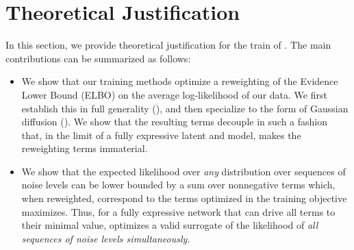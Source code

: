 
\section{Theoretical Justification}
\label{appendix:theory}
\newcommand\numberthis{\addtocounter{equation}{1}\tag{\theequation}}
\newcommand{\cD}{\mathcal{D}}
\newcommand{\unifsim}{\overset{\mathrm{unif}}{\sim}}
\newcommand{\Eforward}{\Exp_{\mathrm{forward}}}
\newcommand{\EforwardD}{\Exp_{\mathrm{forward},\cD}}

\newcommand{\Epz}{\Exp_{p,\mathbf{z}_{1:T}}}
\newcommand{\I}{\mathbf{1}}
\newcommand{\rmd}{\mathrm{d}}
\newcommand{\Dkl}{\mathrm{D}_{\mathbb{KL}}}

\newcommand{\veck}{\mathbf{k}}
\newcommand{\bbK}{\mathbb{K}}
\newcommand{\ptheta}{p_{\bm{\theta}}}

In this section, we provide theoretical justification for the train of \algo. The main contributions can be summarized as follows:
\begin{itemize}
    \item We show that our training methods optimize a reweighting of the Evidence Lower Bound (ELBO) on the average log-likelihood of our data. We first establish this in full generality (), and then specialize to the form of Gaussian diffusion (). We show that the resulting terms decouple in such a fashion that, in the limit of a fully expressive latent and model, makes the reweighting terms immaterial. 
    \item We show that the expected likelihood over \emph{any} distribution over sequences of noise levels can be lower bounded by a sum over nonnegative terms which, when reweighted, correspond to the terms optimized in the \algo{} training objective maximizes.  Thus, for a fully expressive network that can drive all terms to their minimal value, \algo{} optimizes a valid surrogate of the likelihood of \emph{all sequences of noise levels simultaneously.}
\end{itemize}

